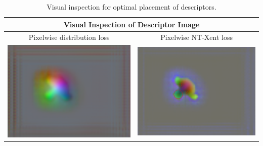 \begin{table}[htb]
    \centering
    \begin{tabular}{lc}
        \hline
        \multicolumn{2}{c}{Visual Inspection of Descriptor Image}                                                                                                            \\ \hline
        \multicolumn{1}{c|}{Pixelwise distribution loss }                                         & \multicolumn{1}{c}{Pixelwise NT-Xent loss}                               \\
        \multicolumn{1}{c|}{\includegraphics[scale=0.2]{images/don/don-d3-resnet50-nc1024-c.png}} & \multicolumn{1}{c}{\includegraphics[scale=0.2]{images/don/defects.png} } \\ \hline
    \end{tabular}
    \caption{Visual inspection for optimal placement of descriptors.}
    \label{table:don}
\end{table}

